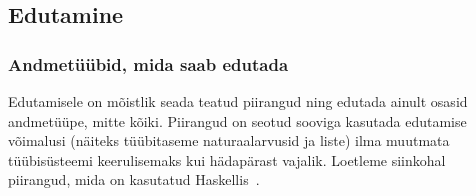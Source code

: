 \documentclass[12pt]{article}
\begin{document}
\begin{comment}
    \end{kood}
  \end{frame}
  \begin{frame}[fragile]{Examples Revisited}
    \begin{kood}{Multidimensional Vectors}
      \begin{verbatim}
data Multivec :: [Nat] -> * -> * where
  ZDimensional :: (t :: *) -> Multivec LNil t
  NDimensional ::
    Vec (n :: Nat) (Multivec (l :: [Nat]) (t :: *)) ->
    Multivec (LCons n l) t\end{verbatim}
    \end{kood}
  \end{frame}
  \begin{frame}[fragile]{The New Kind and Type System}
    \begin{tabular}{c||c|c}
            & Old                  & New              \\\hline\hline
      Sort & Not necessary        & \verb!* | * -> k! \\\hline
      Kind & \verb!* | k -> l!    & \verb!Name | k l! \\\hline
      Type & No kind polymorphism & Kind polymorphism
    \end{tabular}
\end{comment}
    \subsection{Edutamine}
      \subsubsection{Andmetüübid, mida saab edutada}
        Edutamisele on mõistlik seada teatud piirangud ning edutada ainult osasid andmetüüpe, mitte kõiki. Piirangud on seotud sooviga kasutada edutamise võimalusi (näiteks tüübitaseme naturaalarvusid ja liste) ilma muutmata tüübisüsteemi keerulisemaks kui hädapärast vajalik. Loetleme siinkohal piirangud, mida on kasutatud Haskellis~\cite{Giv}.
\end{document}
